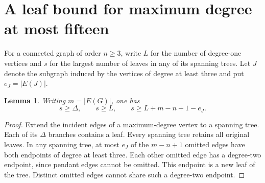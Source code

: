 \documentclass[11pt,a4paper]{article}
\newtheorem{lemma}[theorem]{Lemma}\newtheorem{corollary}[theorem]{Corollary}
\begin{document}
\section{A leaf bound for maximum degree at most fifteen}\label{p06-sec:leaf15}
For a connected graph of order $n\ge3$, write $L$ for the number of
degree-one vertices and $s$ for the largest number of leaves in any of
its spanning trees. Let $J$ denote the subgraph induced by the vertices
of degree at least three and put $e_J=|E(J)|$.
\begin{lemma}\label{p06-lem:leaf15}
Writing $m=|E(G)|$, one has
\[
  s\ge\Delta,\qquad s\ge L,\qquad s\ge L+m-n+1-e_J .
\]
\end{lemma}
\begin{proof}
Extend the incident edges of a maximum-degree vertex to a spanning tree.
Each of its $\Delta$ branches contains a leaf. Every spanning tree
retains all original leaves. In any spanning tree, at most $e_J$ of
the $m-n+1$ omitted edges have both endpoints of degree at least three.
Each other omitted edge has a degree-two endpoint, since pendant edges
cannot be omitted. This endpoint is a new leaf of the tree. Distinct
omitted edges cannot share such a degree-two endpoint.
\end{proof}
\end{document}
